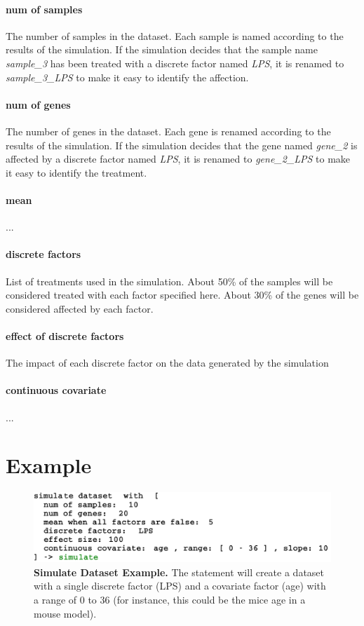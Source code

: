 \paragraph{num of samples}
The number of samples in the dataset. Each sample is named according to the results of the simulation. If the simulation decides that the sample name \emph{sample\_3 }has been treated with a discrete factor named \emph{LPS}, it is renamed to \emph{sample\_3\_LPS} to make it easy to identify the affection.

\paragraph{num of genes}
The number of genes in the dataset. Each gene is renamed according to the results  of the simulation. If the simulation decides that the gene named \emph{gene\_2} is affected by a discrete factor named \emph{LPS}, it is renamed to \emph{gene\_2\_LPS} to make it easy to identify the treatment.

\paragraph{mean}
...

\paragraph{discrete factors}
List of treatments used in the simulation. About 50\% of the samples will be considered treated with each factor specified here. About 30\% of the genes will be considered affected by each factor.

\paragraph{effect of discrete factors}
The impact of each discrete factor on the data generated by the simulation

\paragraph{continuous covariate}
...


\section{Example}

\begin{figure}[h!tbp]
  \centering
  \includegraphics[width=\figWidthWide]{figures/SimulateStatementWithParameters.pdf}
\caption[SimulateDataset Example.]{\textbf{Simulate Dataset Example.} The statement will create a dataset with a single discrete factor (LPS) and a covariate factor (age) with a range of 0 to 36 (for instance, this could be the mice age in a mouse model). }
\label{fig:SimulateDatasetExample}
\end{figure}


